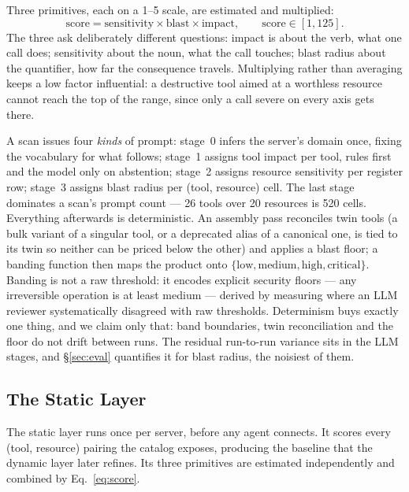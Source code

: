 Three primitives, each on a 1--5 scale, are estimated and multiplied:
\begin{equation}
\mathrm{score} = \mathrm{sensitivity} \times \mathrm{blast} \times
                 \mathrm{impact}, \qquad \mathrm{score} \in [1, 125].
\label{eq:score}
\end{equation}
The three ask deliberately different questions: impact is about the verb, what
one call does; sensitivity about the noun, what the call touches; blast radius
about the quantifier, how far the consequence travels. Multiplying rather than
averaging keeps a low factor influential: a destructive tool aimed at a
worthless resource cannot reach the top of the range, since only a call severe
on every axis gets there.

A scan issues four \emph{kinds} of prompt: stage~0 infers the server's domain
once, fixing the vocabulary for what follows; stage~1 assigns tool impact per
tool, rules first and the model only on abstention; stage~2 assigns resource
sensitivity per register row; stage~3 assigns blast radius per (tool, resource)
cell. The last stage dominates a scan's prompt count --- 26 tools over 20
resources is 520 cells. Everything afterwards is deterministic. An assembly pass reconciles
twin tools (a bulk variant of a singular tool, or a deprecated alias of a
canonical one, is tied to its twin so neither can be priced below the other)
and applies a blast floor; a banding function then maps the product onto
$\{\textrm{low}, \textrm{medium}, \textrm{high}, \textrm{critical}\}$. Banding
is not a raw threshold: it encodes explicit security floors --- any
irreversible operation is at least medium --- derived by measuring where an LLM
reviewer systematically disagreed with raw thresholds. Determinism buys exactly
one thing, and we claim only that: band boundaries, twin reconciliation and the
floor do not drift between runs. The residual run-to-run variance sits in the
LLM stages, and \S\ref{sec:eval} quantifies it for blast radius, the noisiest
of them.

\subsection{The Static Layer}
\label{sec:static}

The static layer runs once per server, before any agent connects. It scores
every (tool, resource) pairing the catalog exposes, producing the baseline
that the dynamic layer later refines. Its three primitives are estimated
independently and combined by Eq.~\ref{eq:score}.

